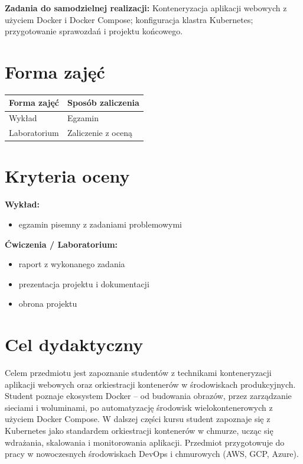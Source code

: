\documentclass[12pt, a4paper]{article}
\newcommand{\thdrule}{\noalign{\global\setlength{\extrarowheight}{0pt}}}
\newcommand{\thdend}{\noalign{\global\setlength{\extrarowheight}{3pt}}}
\begin{document}
\vspace{4pt}
\noindent\textbf{Zadania do samodzielnej realizacji:} Konteneryzacja aplikacji webowych z użyciem Docker i Docker Compose; konfiguracja klastra Kubernetes; przygotowanie sprawozdań i projektu końcowego.

\section{Forma zajęć}

\begin{center}
{\scriptsize
\begin{tabular}{m{5cm}m{8cm}}
\thdrule\toprule
\rowcolor{pjatkRed} {\color{white}\textbf{Forma zajęć}} & {\color{white}\textbf{Sposób zaliczenia}} \\
\midrule\thdend
  \rowcolor{tableRowLight} Wykład & Egzamin \\
  \rowcolor{tableRowAlt} Laboratorium & Zaliczenie z oceną \\
\bottomrule
\end{tabular}}
\end{center}

\section{Kryteria oceny}

\textbf{Wykład:}
\begin{itemize}
  \item egzamin pisemny z zadaniami problemowymi
\end{itemize}
\vspace{4pt}
\textbf{Ćwiczenia / Laboratorium:}
\begin{itemize}
  \item raport z wykonanego zadania
  \item prezentacja projektu i dokumentacji
  \item obrona projektu
\end{itemize}


\section{Cel dydaktyczny}

Celem przedmiotu jest zapoznanie studentów z technikami konteneryzacji aplikacji webowych oraz orkiestracji kontenerów w środowiskach produkcyjnych. Student poznaje ekosystem Docker – od budowania obrazów, przez zarządzanie sieciami i woluminami, po automatyzację środowisk wielokontenerowych z użyciem Docker Compose. W dalszej części kursu student zapoznaje się z Kubernetes jako standardem orkiestracji kontenerów w chmurze, ucząc się wdrażania, skalowania i monitorowania aplikacji. Przedmiot przygotowuje do pracy w nowoczesnych środowiskach DevOps i chmurowych (AWS, GCP, Azure).
\end{document}
